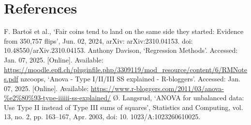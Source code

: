 \documentclass[a4paper, 12pt,oneside]{article}
\begin{document}
	\section*{References}
		\noindent[1] F. Bartoš et al., `Fair coins tend to land on the same side they started: Evidence from 350,757 flips', Jun. 02, 2024, arXiv: arXiv:2310.04153. doi: 10.48550/arXiv.2310.04153.
		\newline[2] Anthony Davison, `Regression Methods'. Accessed: Jan. 07, 2025. [Online]. Available: \url{https://moodle.epfl.ch/pluginfile.php/3309119/mod_resource/content/6/RMNotes.pdf}
		\newline[3] nzcoops, `Anova - Type I/II/III SS explained - R-bloggers'. Accessed: Jan. 07, 2025. [Online]. Available: \newline\url{https://www.r-bloggers.com/2011/03/anova-\%e2\%80\%93-type-iiiiii-ss-explained/} 
		\newline[4] Ø. Langsrud, `ANOVA for unbalanced data: Use Type II instead of Type III sums of squares', Statistics and Computing, vol. 13, no. 2, pp. 163--167, Apr. 2003, doi: 10. 1023/A:1023260610025.
\end{document}
